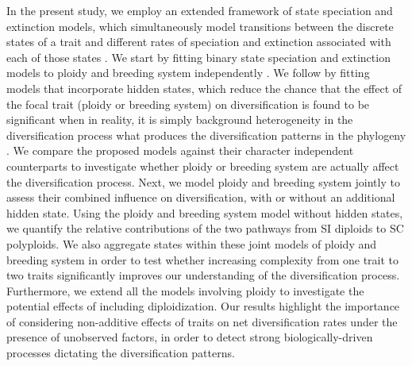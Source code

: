 In the present study, we employ an extended framework of state speciation and extinction models, which simultaneously model transitions between the discrete states of a trait and different rates of speciation and extinction associated with each of those states \citep[`SSE' models;][]{maddison_2007, fitzjohn_2012}.
We start by fitting binary state speciation and extinction models to ploidy and breeding system independently \citep{maddison_2007}.
We follow by fitting models that incorporate hidden states, which reduce the chance that the effect of the focal trait (ploidy or breeding system) on diversification is found to be significant when in reality, it is simply background heterogeneity in the diversification process what produces the diversification patterns in the phylogeny \citep{beaulieu_2016}. %
We compare the proposed models against their character independent counterparts \citep{beaulieu_2016} to investigate whether ploidy or breeding system are actually affect the diversification process.
Next, we model ploidy and breeding system jointly to assess their combined influence on diversification, with or without an additional hidden state.
Using the ploidy and breeding system model without hidden states, we quantify the relative contributions of the two pathways from SI diploids to SC polyploids.
We also aggregate states within these joint models of ploidy and breeding system in order to test whether increasing complexity from one trait to two traits significantly improves our understanding of the diversification process.
Furthermore, we extend all the models involving ploidy to investigate the potential effects of including diploidization.
Our results highlight the importance of considering non-additive effects of traits on net diversification rates  under the presence of unobserved factors, in order to detect strong biologically-driven processes dictating the diversification patterns.
